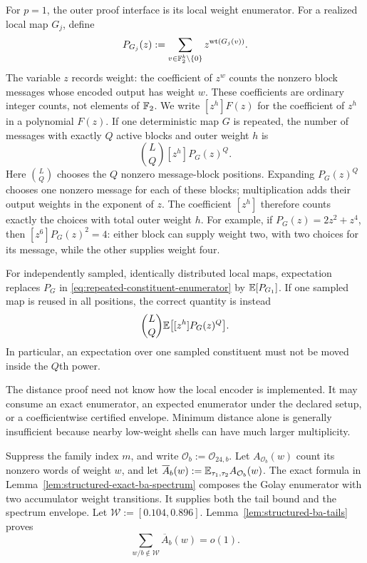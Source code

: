 For $p=1$, the outer proof interface is its local weight enumerator.
For a realized local map $G_j$, define
\begin{equation}
  P_{G_j}(z)
  :=
  \sum_{v\in\mathbb F_2^k\setminus\{0\}}z^{\operatorname{wt}(G_j(v))}.
  \label{eq:local-constituent-enumerator}
\end{equation}
The variable $z$ records weight: the coefficient of $z^w$ counts the
nonzero block messages whose encoded output has weight $w$.
These coefficients are ordinary integer counts, not elements of $\mathbb F_2$.
We write $[z^h]F(z)$ for the coefficient of $z^h$ in a polynomial $F(z)$.
If one deterministic map $G$ is repeated, the number of messages with exactly
$Q$ active blocks and outer weight $h$ is
\begin{equation}
  \binom LQ [z^h]P_G(z)^Q.
  \label{eq:repeated-constituent-enumerator}
\end{equation}
Here $\binom LQ$ chooses the $Q$ nonzero message-block positions.
Expanding $P_G(z)^Q$ chooses one nonzero message for each of these blocks;
multiplication adds their output weights in the exponent of $z$.
The coefficient $[z^h]$ therefore counts exactly the choices with total
outer weight $h$. For example, if $P_G(z)=2z^2+z^4$, then
$[z^6]P_G(z)^2=4$: either block can supply weight two, with two choices
for its message, while the other supplies weight four.

For independently sampled, identically distributed local maps, expectation
replaces $P_G$ in \eqref{eq:repeated-constituent-enumerator} by
$\mathbb E[P_{G_1}]$. If one sampled map is reused in all positions, the correct
quantity is instead
\begin{equation}
  \binom LQ\mathbb E\bigl[[z^h]P_G(z)^Q\bigr].
  \label{eq:shared-constituent-enumerator}
\end{equation}
In particular, an expectation over one sampled constituent must not be moved
inside the $Q$th power.

The distance proof need not know how the local encoder is implemented. It may
consume an exact enumerator, an expected enumerator under the declared setup,
or a coefficientwise certified envelope. Minimum distance alone is generally
insufficient because nearby low-weight shells can have much larger
multiplicity.

Suppress the family index $m$, and write $\mathcal O_b:=\mathcal O_{24,b}$.
Let $A_{\mathcal O_b}(w)$ count its nonzero words of weight $w$, and let
$\overline A_b(w):=\mathbb E_{\tau_1,\tau_2}A_{\mathcal O_b}(w)$.
The exact formula in Lemma~\ref{lem:structured-exact-ba-spectrum} composes
the Golay enumerator with two accumulator weight transitions.
It supplies both the tail bound and the spectrum envelope.
Let $\mathcal W:=[0.104,0.896]$. Lemma~\ref{lem:structured-ba-tails}
proves
\begin{equation}
  \sum_{w/b\notin\mathcal W}\overline A_b(w)=o(1).
  \label{eq:structured-ba-tail}
\end{equation}

